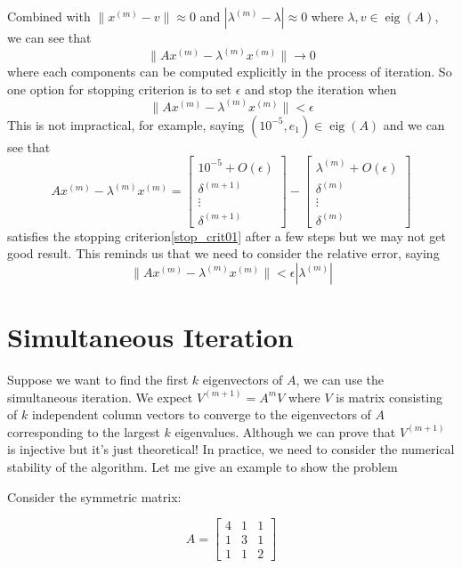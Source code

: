 \documentclass[12pt]{article}
\begin{document}
Combined with $\|x^{(m)}-v\|\approx 0$ and $|\lambda^{(m)} -\lambda|\approx 0$ where $\lambda, v\in\operatorname{eig}(A)$, we can see that
$$
\|Ax^{(m)}-\lambda^{(m)}x^{(m)}\| \to 0
$$
where each components can be computed explicitly in the process of iteration. So one option for stopping criterion is to set $\epsilon$ and stop the iteration when
\begin{equation}
    \label{stop_crit01}
\|Ax^{(m)}-\lambda^{(m)}x^{(m)}\| < \epsilon
\end{equation}
This is not impractical, for example, saying $(10^{-5},e_{1})\in\operatorname{eig}(A)$ and we can see that
$$
Ax^{(m)}-\lambda^{(m)}x^{(m)} = \begin{bmatrix} 
    10^{-5}+O(\epsilon) \\ 
    \delta^{(m+1)} \\
    \vdots \\
    \delta^{(m+1)} \end{bmatrix} - \begin{bmatrix}
        \lambda^{(m)} + O(\epsilon)\\
        \delta^{(m)} \\
    \vdots \\
    \delta^{(m)}
    \end{bmatrix}
$$
satisfies the stopping criterion\eqref{stop_crit01} after a few steps but we may not get good result. 
This reminds us that we need to consider the relative error, saying
\begin{equation}
    \label{stop_crit02}
\|Ax^{(m)}-\lambda^{(m)}x^{(m)}\| < \epsilon |\lambda^{(m)}|
\end{equation}


\section{Simultaneous Iteration}

Suppose we want to find the first $k$ eigenvectors of $A$, we can use the simultaneous iteration. 
We expect $V^{(m+1)} = A^{m}V$ where $V$ is matrix consisting of $k$ independent column vectors to converge to the eigenvectors of $A$ corresponding to the largest $k$ eigenvalues.
Although we can prove that $V^{(m+1)}$ is injective but it's just theoretical! In practice, we need to consider the numerical stability of the algorithm. Let me give an example to show the problem

Consider the symmetric matrix:

$$
A = \begin{bmatrix} 4 & 1 & 1 \\ 1 & 3 & 1 \\ 1 & 1 & 2 \end{bmatrix}
$$
\end{document}
